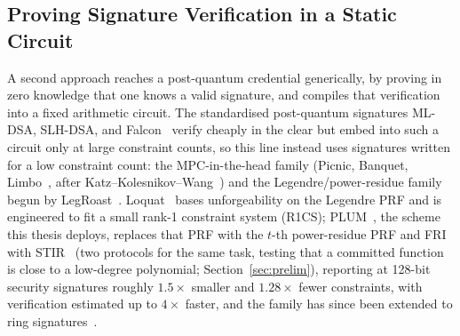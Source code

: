 \subsection{Proving Signature Verification in a Static Circuit}
A second approach reaches a post-quantum credential generically, by proving in zero knowledge that one knows a valid signature, and compiles that verification into a fixed arithmetic circuit. The standardised post-quantum signatures ML-DSA, SLH-DSA, and Falcon~\cite{fips204,fips205,fips206} verify cheaply in the clear but embed into such a circuit only at large constraint counts, so this line instead uses signatures written for a low constraint count: the MPC-in-the-head family (Picnic, Banquet, Limbo~\cite{chase2017picnic,baum2021banquet,desaintguilhem2021limbo}, after Katz--Kolesnikov--Wang~\cite{katz2018kkw}) and the Legendre/power-residue family begun by LegRoast~\cite{beullens2020legroast}. Loquat~\cite{cryptoeprint:2024/868} bases unforgeability on the Legendre PRF and is engineered to fit a small rank-1 constraint system (R1CS); PLUM~\cite{10.1007/978-981-95-2961-2_6}, the scheme this thesis deploys, replaces that PRF with the $t$-th power-residue PRF and FRI with STIR~\cite{cryptoeprint:2024/390} (two protocols for the same task, testing that a committed function is close to a low-degree polynomial; Section~\ref{sec:prelim}), reporting at 128-bit security signatures roughly $1.5\times$ smaller and $1.28\times$ fewer constraints, with verification estimated up to $4\times$ faster, and the family has since been extended to ring signatures~\cite{cryptoeprint:2025/1841}.

